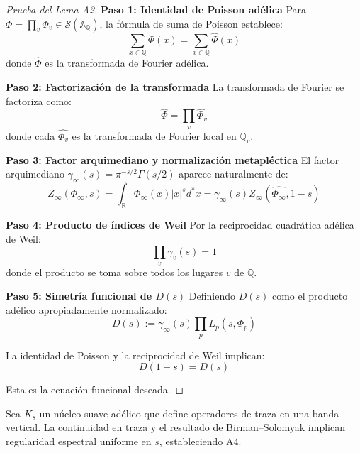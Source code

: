 \begin{proof}[Prueba del Lema A2]
\textbf{Paso 1: Identidad de Poisson adélica}
Para $\Phi = \prod_v \Phi_v \in \mathcal{S}(\mathbb{A}_\mathbb{Q})$, la fórmula de suma de Poisson establece:
$$\sum_{x \in \mathbb{Q}} \Phi(x) = \sum_{x \in \mathbb{Q}} \widehat{\Phi}(x)$$
donde $\widehat{\Phi}$ es la transformada de Fourier adélica.

\textbf{Paso 2: Factorización de la transformada}
La transformada de Fourier se factoriza como:
$$\widehat{\Phi} = \prod_v \widehat{\Phi_v}$$
donde cada $\widehat{\Phi_v}$ es la transformada de Fourier local en $\mathbb{Q}_v$.

\textbf{Paso 3: Factor arquimediano y normalización metapléctica}
El factor arquimediano $\gamma_\infty(s) = \pi^{-s/2}\Gamma(s/2)$ aparece naturalmente de:
$$Z_\infty(\Phi_\infty, s) = \int_{\mathbb{R}} \Phi_\infty(x) |x|^s d^*x = \gamma_\infty(s) Z_\infty(\widehat{\Phi_\infty}, 1-s)$$

\textbf{Paso 4: Producto de índices de Weil}
Por la reciprocidad cuadrática adélica de Weil:
$$\prod_v \gamma_v(s) = 1$$
donde el producto se toma sobre todos los lugares $v$ de $\mathbb{Q}$.

\textbf{Paso 5: Simetría funcional de $D(s)$}
Definiendo $D(s)$ como el producto adélico apropiadamente normalizado:
$$D(s) := \gamma_\infty(s) \prod_{p} L_p(s, \Phi_p)$$

La identidad de Poisson y la reciprocidad de Weil implican:
$$D(1-s) = D(s)$$

Esta es la ecuación funcional deseada.
\end{proof}

\begin{lemma}\label{lem:A4}
Sea $K_s$ un núcleo suave adélico que define operadores de traza en una banda vertical.
La continuidad en traza y el resultado de Birman--Solomyak implican regularidad
espectral uniforme en $s$, estableciendo A4.
\end{lemma}

